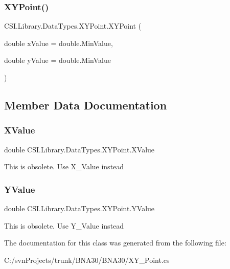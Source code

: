 \subsubsection{\texorpdfstring{XYPoint()}{XYPoint()}}
{\footnotesize\ttfamily C\+S\+I.\+Library.\+Data\+Types.\+X\+Y\+Point.\+X\+Y\+Point (\begin{DoxyParamCaption}\item[{double}]{x\+Value = {\ttfamily double.MinValue},  }\item[{double}]{y\+Value = {\ttfamily double.MinValue} }\end{DoxyParamCaption})\hspace{0.3cm}{\ttfamily [inline]}}







\subsection{Member Data Documentation}
\mbox{\label{class_c_s_i_1_1_library_1_1_data_types_1_1_x_y_point_a792f920b008e692ea4809d6ed22e0434}} 
\subsubsection{\texorpdfstring{XValue}{XValue}}
{\footnotesize\ttfamily double C\+S\+I.\+Library.\+Data\+Types.\+X\+Y\+Point.\+X\+Value}



This is obsolete. Use X\+\_\+\+Value instead 

\mbox{\label{class_c_s_i_1_1_library_1_1_data_types_1_1_x_y_point_a06e6e4193710b6809507bb1746b84e43}} 
\subsubsection{\texorpdfstring{YValue}{YValue}}
{\footnotesize\ttfamily double C\+S\+I.\+Library.\+Data\+Types.\+X\+Y\+Point.\+Y\+Value}



This is obsolete. Use Y\+\_\+\+Value instead 



The documentation for this class was generated from the following file\+:\begin{DoxyCompactItemize}
\item 
C\+:/svn\+Projects/trunk/\+B\+N\+A30/\+B\+N\+A30/X\+Y\+\_\+\+Point.\+cs\end{DoxyCompactItemize}

